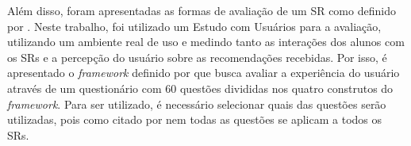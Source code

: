Além disso, foram apresentadas as formas de avaliação de um SR como definido por . Neste
trabalho, foi utilizado um Estudo com Usuários para a avaliação, utilizando um ambiente real de uso e medindo tanto
as interações dos alunos com os SRs e a percepção do usuário sobre as recomendações recebidas. Por isso, é
apresentado o \textit{framework} definido por  que busca avaliar a experiência do usuário através de um
questionário com 60 questões divididas nos quatro construtos do \textit{framework}. Para ser utilizado, é necessário
selecionar quais das questões serão utilizadas, pois como citado por  nem todas as questões se
aplicam a todos os SRs.
